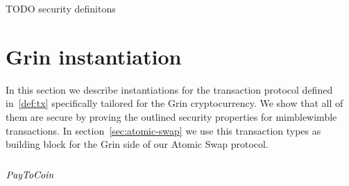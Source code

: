 TODO security definitons

\section{Grin instantiation}\label{sec:atomic-inst}

In this section we describe instantiations for the transaction protocol defined in~\ref{def:tx} specifically tailored for the Grin cryptocurrency. We show that all of them are secure by proving the
outlined security properties for mimblewimble transactions. In section~\ref{sec:atomic-swap} we use this transaction types as building block for the Grin side of our Atomic Swap protocol.

\subsection{$\mathit{PayToCoin}$}

